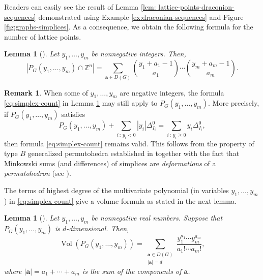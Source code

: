 \documentclass[11pt,a4paper]{article}
\newcommand{\vct}[1]{\boldsymbol{#1}}
\newcommand{\Z}{\mathbb{Z}}
\newcommand{\Vol}{\operatorname{Vol}}
\newcommand{\1}{\mathbf{1}}
\theoremstyle{plain}
\newtheorem{lemma}[theorem]{Lemma}
\theoremstyle{definition}
\newtheorem{remark}[theorem]{Remark}
\begin{document}
Readers can easily see the result of Lemma \ref{lem: lattice-points-draconion-sequences} demonstrated using Example \ref{ex:draconian-sequences} and Figure \ref{fig:graphs-simplices}. As a consequence, we obtain the following formula for the number of lattice points.

\begin{lemma}[\cite{Postnikov2009}]\label{lem:lattice-points-formula-P_G}
Let $y_1,\ldots,y_m$ be nonnegative integers. Then,
\begin{equation}
|P_G(y_1,\ldots,y_m)\cap\Z^n|
=\sum_{\vct{a}\in D(G)}
\binom{y_1+a_1-1}{a_1}\cdots
\binom{y_m+a_m-1}{a_m}.
\label{eq:simplex-count}
\end{equation}
\end{lemma}

\begin{remark}\label{rem:validity-of-negative-coefficients-P_G}
    When some of $y_1, \dots, y_m$ are negative integers, the formula \eqref{eq:simplex-count} in Lemma \ref{lem:lattice-points-formula-P_G} may still apply to $P_G(y_1,\dots,y_m).$ More precisely, if $P_G(y_1,\dots,y_m)$ satisfies
    \begin{equation}\label{eq:Minkowski-summand-P_G}
        P_G(y_1,\dots,y_m) + \sum_{i\,:\,y_i < 0}|y_i|\Delta^0_{I_i} = \sum_{i\,:\, y_i\geq0}y_i\Delta^0_{I_i},
    \end{equation}
    then formula \eqref{eq:simplex-count} remains valid. This follows from the property of type $B$ generalized permutohedra established in \cite[Theorem 6.11]{Bastidas2021} together with the fact that Minkowski sums (and differences) of simplices are \emph{deformations} of a \emph{permutohedron} (see \cite[Remark 6.8]{Postnikov2009}).
\end{remark}

The terms of highest degree of the multivariate polynomial (in variables $y_1, \dots, y_m$) in \eqref{eq:simplex-count} give a volume formula as stated in the next lemma.

\begin{lemma}[\cite{Postnikov2009}]\label{lem: volume-P_G}
   Let $y_1,\ldots,y_m$ be nonnegative real numbers. Suppose that $P_G(y_1,\ldots,y_m)$ is $d$-dimensional.  Then,
\begin{equation}
\Vol(P_G(y_1,\ldots,y_m))
=\sum_{\substack{\vct{a}\in D(G)\\|\vct{a}|=d}}
\frac{y_1^{a_1}\cdots y_m^{a_m}}{a_1! \cdots a_m!},
\label{eq: volume-P_G}
\end{equation}
 where $|\vct{a}| = a_1+\cdots+a_m$ is the sum of the components of $\vct{a}$.
\end{lemma}
\end{document}
